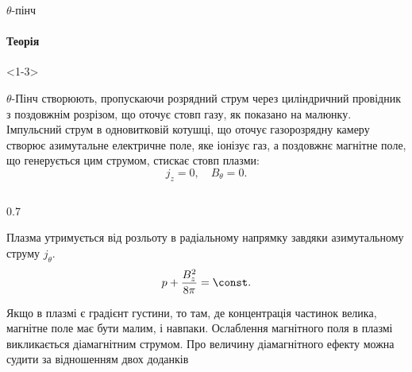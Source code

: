 \documentclass[]{beamer}
\begin{document}
%

\begin{frame}{$\theta$-пінч}
	\framesubtitle<1-3>{Теорія}
	\begin{onlyenv}<1-3>
		\begin{block}{}\justifying
			$\theta$-Пінч створюють, пропускаючи розрядний струм через циліндричний провідник з
			поздовжнім розрізом, що оточує стовп газу, як показано на малюнку. Імпульсний струм в
			одновитковій котушці, що оточує газорозрядну камеру створює азимутальне електричне поле,
			яке іонізує газ, а поздовжнє магнітне поле, що генерується цим струмом, стискає стовп
			плазми:
			\begin{equation*}
				j_{z} = 0,\quad B_{\theta} = 0.
			\end{equation*}
		\end{block}
		\begin{columns}
			\begin{column}{0.7\linewidth}
				\begin{block}{}\justifying
					Плазма утримується від розльоту в радіальному напрямку завдяки азимутальному струму $j_{\theta}$.
					\begin{equation*}
						p + \frac{B^2_z}{8\pi} = \const .
					\end{equation*}
				\end{block}
				\begin{block}\justifying
					\begin{overprint}
						Якщо в плазмі є градієнт густини, то там, де концентрація частинок велика, магнітне поле має бути малим, і навпаки. \alert{Ослаблення магнітного поля в плазмі викликається діамагнітним струмом}.
						\onslide<2>
						Про величину діамагнітного ефекту можна судити за відношенням двох доданків

\end{overprint}
\end{block}
\end{column}
\end{columns}
\end{onlyenv}
\end{frame}
\end{document}
